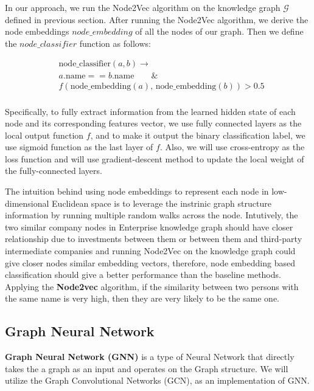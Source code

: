 \documentclass[sigconf, nonacm]{acmart}
\begin{document}
In our approach, we run the Node2Vec algorithm on the knowledge graph $\mathcal{G}$ defined in previous section. After running the Node2Vec algorithm, we derive the node embeddings $node\_embedding$ of all the nodes of our graph. Then we define the $node\_classifier$ function as follows:

\begin{equation*}
    \begin{split}
&\text{node}\_\text{classifier}(a, b) \to  \\
&a.\text{name} == b.\text{name} \qquad \& \\ 
&f(\text{node}\_\text{embedding}(a),\, \text{node}\_\text{embedding}(b) ) > 0.5\\
\end{split}
\end{equation*}

Specifically, to fully extract information from the learned hidden state of each node and its corresponding features vector, we use fully connected layers as the local output function $f$, and to make it output the binary classification label, we use sigmoid function as the last layer of $f$. Also, we will use cross-entropy as the loss function and will use gradient-descent method to update the local weight of the fully-connected layers.

The intuition behind using node embeddings to represent each node in low-dimensional Euclidean space is to leverage the instrinic graph structure information by running multiple random walks across the node. Intutively, the two similar company nodes in Enterprise knowledge graph should have closer relationship due to investments between them or between them and third-party intermediate companies and running Node2Vec on the knowledge graph could give closer nodes similar embedding vectors, therefore, node embedding based classification should give a better performance than the baseline methods.
Applying the \textbf{Node2vec} algorithm, if the similarity between two persons with the same name is very high, then they are very likely to be the same one.
\subsection{Graph Neural Network}
\textbf{Graph Neural Network (GNN)} is a type of Neural Network that directly takes the a graph as an input and operates on the Graph structure. We will utilize the Graph Convolutional Networks (GCN), as an implementation of GNN.
\end{document}
